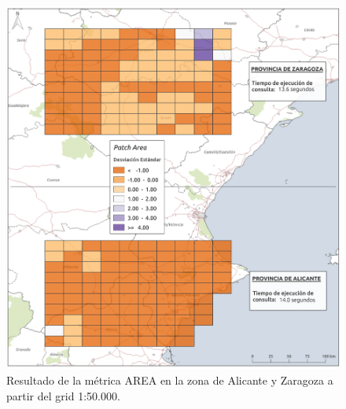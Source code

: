 \begin{figure}
\begin{center}
\includegraphics[width=\textwidth]{ResultadosyDiscusion/Figs/Results/p_50.png}
\caption{Resultado de la métrica AREA en la zona de Alicante y Zaragoza a partir del grid 1:50.000.}
\end{center}
\end{figure}

